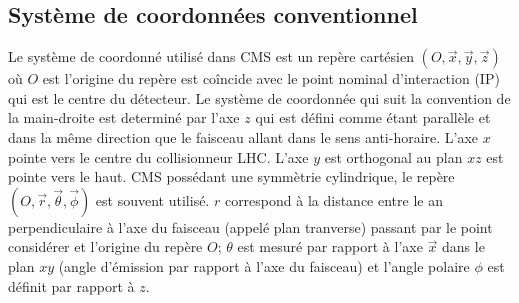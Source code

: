 \subsection{Système de coordonnées conventionnel}
Le système de coordonné utilisé dans CMS est un repère cartésien $\left(O,\vec{x},\vec{y},\vec{z}\right)$ où $O$ est l'origine du repère est coîncide avec le point nominal d'interaction (IP) qui est le centre du détecteur. Le système de coordonnée qui suit la convention de la main-droite est determiné par l'axe $z$ qui est défini comme étant parallèle et dans la même direction que le faisceau allant dans le sens anti-horaire. L'axe $x$ pointe vers le centre du collisionneur LHC. L'axe $y$ est orthogonal au plan $xz$ est pointe vers le haut. CMS possédant une symmètrie cylindrique, le repère $\left(O,\vec{r},\vec{\theta},\vec{\phi}\right)$ est souvent utilisé. $r$ correspond à la distance entre le an perpendiculaire à l'axe du faisceau (appelé plan tranverse) passant par le point considérer et l'origine du repère $O$; $\theta$ est mesuré par rapport à l'axe $\vec{x}$ dans le plan $xy$ (angle d'émission par rapport à l'axe du faisceau) et l'angle polaire $\phi$ est définit par rapport à $z$.

